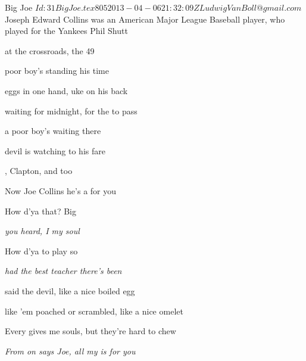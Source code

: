 \begin{SBSong}{Big Joe}
    {$Id: 31BigJoe.tex 805 2013-04-06 21:32:09Z LudwigVanBoll@gmail.com $}
    {Joseph Edward Collins was an American Major League Baseball player, who played for the Yankees}
    {Phil Shutt}
  \begin{SBVerse}
     at the crossroads,  the 49
	
	  poor boy's standing  his time

     eggs in one hand,  uke on his back
	
     waiting for midnight, for the  to pass
	
	  a poor boy's  waiting there
	
	  devil is watching to  his fare

    , Clapton, and  too
	
	 Now  Joe Collins he's a  for you
  \end{SBVerse}
  \begin{SBChorus}
    How d'ya  that?  Big 
	
	 \emph{ you heard, I  my soul}
	
	 How d'ya  to play so 
	
	 \emph{ had the best teacher there's  been}
  \end{SBChorus}
  \CBPageBrk
  \begin{SBVerse}
     said the devil,  like a nice boiled egg
	
	  like 'em poached or scrambled,  like a nice omelet
	
	 Every gives me souls, but they're  hard to chew
	
	 \emph{From  on says Joe, all my  is for you}
	

\end{SBVerse}
\end{SBSong}
